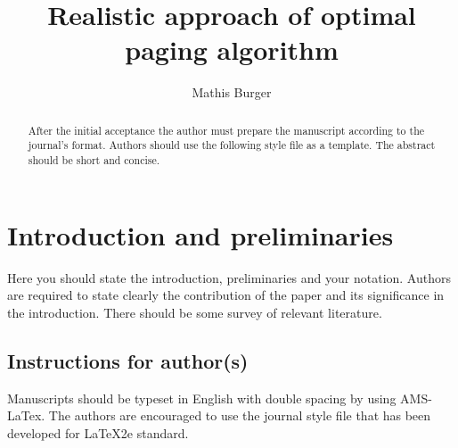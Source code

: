 \documentclass[12pt, reqno]{amsart}
\numberwithin{equation}{section}
\begin{document}
\setcounter{page}{1}



\centerline{}

\centerline{}

\title[Short Title]{Realistic approach of optimal paging algorithm}

\author{Mathis Burger}

\begin{abstract}
After the initial acceptance the author must prepare the manuscript according to the journal's format. Authors should use the following style file as a template. The abstract should be short and concise.
\end{abstract} \maketitle

\section{Introduction and preliminaries}

\noindent Here you should state the introduction, preliminaries and
your notation. Authors are required to state clearly the
contribution of the paper and its significance in the introduction.
There should be some survey of relevant literature.

\subsection{Instructions for author(s)}

Manuscripts should be typeset in English with double spacing by
using AMS-LaTex. The authors are encouraged to use the journal style
file that has been developed for LaTeX2e standard.
\end{document}
